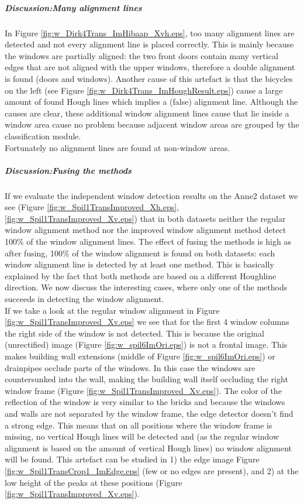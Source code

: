 \subparagraph{Discussion:Many alignment lines}
In Figure \ref{fig:w_Dirk4Trans_ImHibaap_Xvh.eps}, too many alignment lines are
detected and not every alignment line is placed correctly.  This is mainly
because the windows are partially aligned: the two front doors contain many
vertical edges that are not aligned with the upper windows, therefore a double alignment
is found (doors and windows).  Another cause of this artefact is that the
bicycles on the left (see Figure \ref{fig:w_Dirk4Trans_ImHoughResult.eps}) cause
a large amount of found Hough lines which implies a (false) alignment line.
Although the causes are clear, these additional
window alignment lines cause that lie inside a window area cause no problem
because adjacent window areas are grouped by the classification module.\\
Fortunately no alignment lines are found at non-window areas.


\subparagraph{Discussion:Fusing the methods}
If we evaluate the independent window detection results on the Anne2 dataset we see (Figure
\ref{fig:w_Spil1TransImproved_Xh.eps}, \ref{fig:w_Spil1TransImproved_Xv.eps})
that in both datasets neither the regular window alignment method nor the
improved window alignment method detect 100\% of the window alignment lines.  The
effect of fusing the methods is high as after fusing, 100\% of the window
alignment is found on both datasets: each window alignment line is detected by
at least one method.  This is basically explained by the fact that both methods
are based on a different Houghline direction.  We now discuss the interesting
cases, where only one of the methods succeeds in detecting the window alignment.\\

\label{lab:occlusion} If we take a look at the regular window alignment in
Figure \ref{fig:w_Spil1TransImproved_Xv.eps} we see that for the first 4 window
columns the right side of the window is not detected.  This is because the
original (unrectified) image (Figure \ref{fig:w_spil6ImOri.eps}) is not a
frontal image.  This makes building wall extensions (middle of Figure
\ref{fig:w_spil6ImOri.eps}) or drainpipes occlude parts of the windows.  In this
case the windows are countersunked into the wall, making the building wall itself
occluding the right window frame (Figure \ref{fig:w_Spil1TransImproved_Xv.eps}).
The color of the reflection of the window is very similar to the bricks and
because the windows and walls are not separated by the window frame, the edge
detector doesn't find a strong edge.  This means that on all positions where the
window frame is missing, no vertical Hough lines will be detected and (as the
regular window alignment is based on the amount of vertical Hough lines) no window
alignment will be found.  This artefact can be studied in 1) the edge image Figure
\ref{fig:w_Spil1TransCrop1_ImEdge.eps} (few or no edges are present), and 2) at the
low height of the peaks at these positions (Figure
\ref{fig:w_Spil1TransImproved_Xv.eps}).\\

